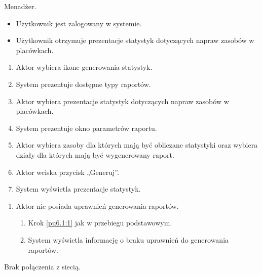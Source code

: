 Menadżer.

\begin{itemize}
\item Użytkownik jest zalogowany w systemie.
\end{itemize}

\begin{itemize}
\item Użytkownik otrzymuje prezentacje statystyk dotyczących napraw zasobów w placówkach.
\end{itemize}

\begin{enumerate}
	\item \label{pu7.3.3:1} Aktor wybiera ikone generowania statystyk.
	\item System prezentuje dostępne typy raportów.
	\item \label{pu7.3.3:2} Aktor wybiera prezentacje statystyk dotyczących napraw zasobów w placówkach.
	\item System prezentuje okno parametrów raportu.
	\item Aktor wybiera zasoby dla których mają być obliczane statystyki oraz wybiera działy dla których mają być wygenerowany raport.
	\item Aktor wciska przycisk „Generuj”.
	\item System wyświetla prezentacje statystyk.
\end{enumerate}

\begin{enumerate}
	\item Aktor nie posiada uprawnień generowania raportów.
	\begin{enumerate}[label*=\arabic*.]
		\item Krok \ref{pu6.1:1} jak w przebiegu podstawowym.
		\item System wyświetla informację o braku uprawnień do generowania raportów.
	\end{enumerate}
\end{enumerate}

Brak połączenia z siecią.

